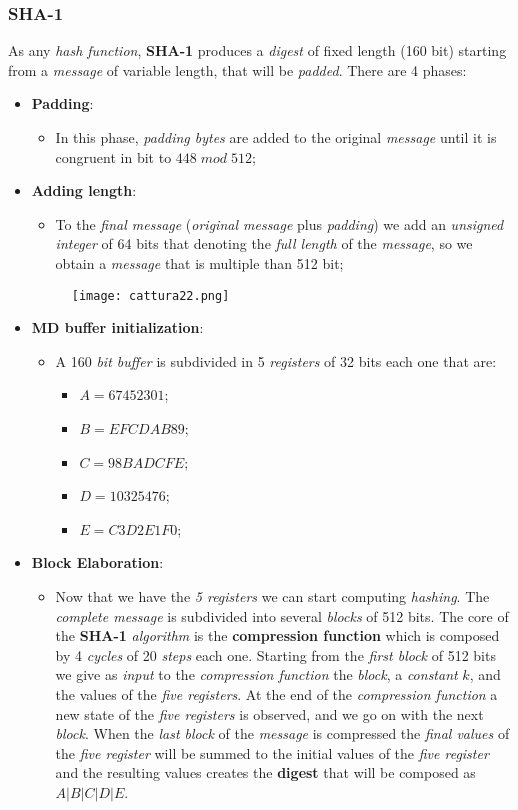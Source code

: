 \documentclass{article}
\begin{document}
\subsubsection{SHA-1}
As any \emph{hash function}, \textbf{SHA-1} produces a \emph{digest} of fixed length (160 bit) starting from a \emph{message} of variable length, that will be \emph{padded}. There are 4 phases:
\begin{itemize}
\item \textbf{Padding}:
\begin{itemize}
\item In this phase, \emph{padding bytes} are added to the original \emph{message} until it is congruent in bit to $448\; mod\; 512$;
\end{itemize}

\item \textbf{Adding length}:
\begin{itemize}
\item To the \emph{final message} (\emph{original message} plus \emph{padding}) we add an \emph{unsigned integer} of 64 bits that denoting the \emph{full length} of the \emph{message}, so we obtain a \emph{message} that is multiple than 512 bit;
\end{itemize}
 \begin{figure}[H]
  \centering
  \texttt{[image: cattura22.png]}
\end{figure}
\item \textbf{MD buffer initialization}:
\begin{itemize}
\item A 160 \emph{bit buffer} is subdivided in 5 \emph{registers} of 32 bits each one that are:
\begin{itemize}
\item $A=67452301$;
\item $B = EFCDAB89$;
\item $C = 98BADCFE$;
\item $D = 10325476$;
\item $E = C3D2E1F0$;
\end{itemize}
\end{itemize} 
\item \textbf{Block Elaboration}:
\begin{itemize}
\item  Now that we have the \emph{5 registers} we can start computing \emph{hashing}. The \emph{complete message} is subdivided into several \emph{blocks} of 512 bits. The core of the \textbf{SHA-1} \emph{algorithm} is the \textbf{compression function} which is composed by 4 \emph{cycles} of 20 \emph{steps} each one. Starting from the \emph{first block} of 512 bits we give as \emph{input} to the \emph{compression function} the \emph{block}, a \emph{constant} $k$, and the values of the \emph{five registers}. At the end of the \emph{compression function} a new state of the \emph{five registers} is observed, and we go on with the next \emph{block}. When the \emph{last block} of the \emph{message} is compressed the \emph{final values} of the \emph{five register} will be summed to the initial values of the \emph{five register} and the resulting values creates the \textbf{digest} that will be composed as $A|B|C|D|E$. 

\end{itemize}
\end{itemize}
\end{document}
